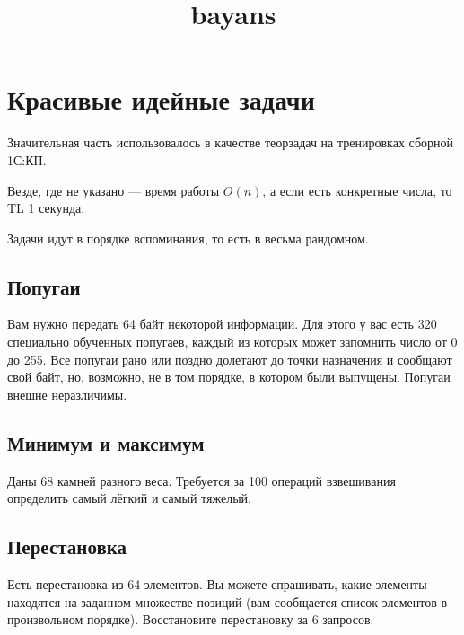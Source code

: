\documentclass[11pt]{article}
\title{bayans}
\begin{document}
    
    
    \maketitle
    
    

    
    \section{Красивые идейные
задачи}\label{ux43aux440ux430ux441ux438ux432ux44bux435-ux438ux434ux435ux439ux43dux44bux435-ux437ux430ux434ux430ux447ux438}

Значительная часть использовалось в качестве теорзадач на тренировках
сборной 1С:КП.

Везде, где не указано --- время работы \(O(n)\), а если есть конкретные
числа, то TL 1 секунда.

Задачи идут в порядке вспоминания, то есть в весьма рандомном.

    \subsection{Попугаи}\label{ux43fux43eux43fux443ux433ux430ux438}

Вам нужно передать 64 байт некоторой информации. Для этого у вас есть
320 специально обученных попугаев, каждый из которых может запомнить
число от 0 до 255. Все попугаи рано или поздно долетают до точки
назначения и сообщают свой байт, но, возможно, не в том порядке, в
котором были выпущены. Попугаи внешне неразличимы.

    \subsection{Минимум и
максимум}\label{ux43cux438ux43dux438ux43cux443ux43c-ux438-ux43cux430ux43aux441ux438ux43cux443ux43c}

Даны 68 камней разного веса. Требуется за 100 операций взвешивания
определить самый лёгкий и самый тяжелый.

    \subsection{Перестановка}\label{ux43fux435ux440ux435ux441ux442ux430ux43dux43eux432ux43aux430}

Есть перестановка из 64 элементов. Вы можете спрашивать, какие элементы
находятся на заданном множестве позиций (вам сообщается список элементов
в произвольном порядке). Восстановите перестановку за 6 запросов.
\end{document}
